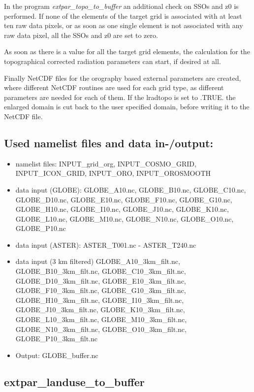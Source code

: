 \documentclass[a4paper,10pt,DIV14,BCOR1cm,titlepage,twoside]{scrartcl}
\begin{document}
In the program \textit{extpar\_topo\_to\_buffer} an additional check on SSOs and z0 is performed. If none of the elements of the target grid is associated with at least ten raw data pixels, or as soon as one single element is not associated with any raw data pixel, all the SSOs and z0 are set to zero.\par\medskip\noindent
As soon as there is a value for all the target grid elements, the calculation for the topographical corrected radiation parameters can start, if desired at all.\par\medskip\noindent
Finally NetCDF files for the orography based external parameters are created, where different NetCDF routines are used for each grid type, as different parameters are needed for each of them. If the lradtopo is set to .TRUE. the enlarged domain is cut back to the user specified domain, before writing it to the NetCDF file.\par\medskip\noindent
\subsection{Used namelist files and data in-/output:}
\begin{itemize}
 \item namelist files: INPUT\_grid\_org, INPUT\_COSMO\_GRID, INPUT\_ICON\_GRID, INPUT\_ORO, INPUT\_OROSMOOTH
\item data input (GLOBE): GLOBE\_A10.nc, GLOBE\_B10.nc, GLOBE\_C10.nc, GLOBE\_D10.nc, GLOBE\_E10.nc, GLOBE\_F10.nc, GLOBE\_G10.nc, GLOBE\_H10.nc, GLOBE\_I10.nc, GLOBE\_J10.nc, GLOBE\_K10.nc, GLOBE\_L10.nc, GLOBE\_M10.nc, GLOBE\_N10.nc, GLOBE\_O10.nc, GLOBE\_P10.nc 
\item data input (ASTER): ASTER\_T001.nc - ASTER\_T240.nc
\item data input (3 km filtered) GLOBE\_A10\_3km\_filt.nc, GLOBE\_B10\_3km\_filt.nc, GLOBE\_C10\_3km\_filt.nc, GLOBE\_D10\_3km\_filt.nc, GLOBE\_E10\_3km\_filt.nc, GLOBE\_F10\_3km\_filt.nc, GLOBE\_G10\_3km\_filt.nc, GLOBE\_H10\_3km\_filt.nc, GLOBE\_I10\_3km\_filt.nc, GLOBE\_J10\_3km\_filt.nc, GLOBE\_K10\_3km\_filt.nc, GLOBE\_L10\_3km\_filt.nc, GLOBE\_M10\_3km\_filt.nc, GLOBE\_N10\_3km\_filt.nc, GLOBE\_O10\_3km\_filt.nc, GLOBE\_P10\_3km\_filt.nc
\item Output: GLOBE\_buffer.nc
\end{itemize}

\subsection{extpar\_landuse\_to\_buffer}\label{extpar_landuse_to_buffer}
\end{document}
